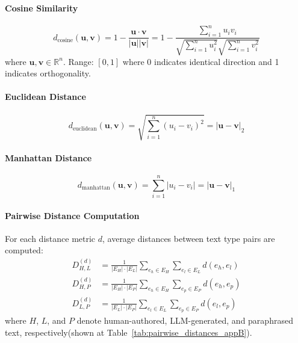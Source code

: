 \paragraph{Cosine Similarity}
\begin{equation}
\label{eq:cosine_similarity}
d_{\text{cosine}}(\mathbf{u}, \mathbf{v}) = 1 - \frac{\mathbf{u} \cdot \mathbf{v}}{|\mathbf{u}||\mathbf{v}|} = 1 - \frac{\sum_{i=1}^{n} u_i v_i}{\sqrt{\sum_{i=1}^{n} u_i^2} \sqrt{\sum_{i=1}^{n} v_i^2}}
\end{equation}
where $\mathbf{u}, \mathbf{v} \in \mathbb{R}^n$. Range: $[0, 1]$ where 0 indicates identical direction and 1 indicates orthogonality.

\paragraph{Euclidean Distance}
\begin{equation}
\label{eq:euclidean_distance}
d_{\text{euclidean}}(\mathbf{u}, \mathbf{v}) = \sqrt{\sum_{i=1}^{n} (u_i - v_i)^2} = |\mathbf{u} - \mathbf{v}|_2
\end{equation}

\paragraph{Manhattan Distance}
\begin{equation}
\label{eq:manhattan_distance}
d_{\text{manhattan}}(\mathbf{u}, \mathbf{v}) = \sum_{i=1}^{n} |u_i - v_i| = |\mathbf{u} - \mathbf{v}|_1
\end{equation}

\paragraph{Pairwise Distance Computation}
For each distance metric $d$, average distances between text type pairs are computed:
\begin{align}
\label{eq:pairwise_distance}
D_{H,L}^{(d)} &= \frac{1}{|E_H| \cdot |E_L|} \sum_{e_h \in E_H} \sum_{e_l \in E_L} d(e_h, e_l) \\
D_{H,P}^{(d)} &= \frac{1}{|E_H| \cdot |E_P|} \sum_{e_h \in E_H} \sum_{e_p \in E_P} d(e_h, e_p) \\
D_{L,P}^{(d)} &= \frac{1}{|E_L| \cdot |E_P|} \sum_{e_l \in E_L} \sum_{e_p \in E_P} d(e_l, e_p)
\end{align}
where $H$, $L$, and $P$ denote human-authored, LLM-generated, and paraphrased text, respectively(shown at Table~\ref{tab:pairwise_distances_appB}).

